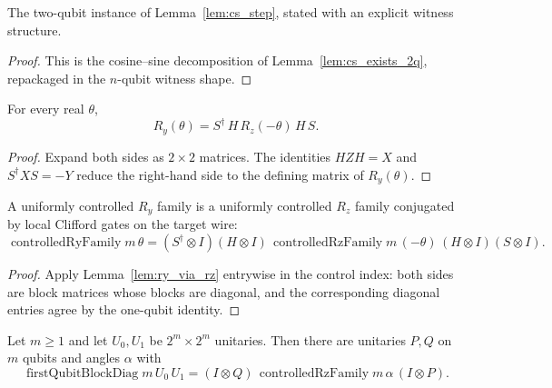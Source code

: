 \begin{lemma}
  \label{lem:cs_step_2q}
  \leanok
  The two-qubit instance of Lemma~\ref{lem:cs_step}, stated with an explicit
  witness structure.
\end{lemma}

\begin{proof}
  \leanok
  This is the cosine--sine decomposition of Lemma~\ref{lem:cs_exists_2q},
  repackaged in the $n$-qubit witness shape.
\end{proof}

\begin{lemma}[$R_y$ via $R_z$]
  \label{lem:ry_via_rz}
  \leanok
  For every real $\theta$,
  \[
    R_y(\theta) = S^\dagger\, H\, R_z(-\theta)\, H\, S.
  \]
\end{lemma}

\begin{proof}
  \leanok
  Expand both sides as $2 \times 2$ matrices.  The identities $HZH = X$ and
  $S^\dagger X S = -Y$ reduce the right-hand side to the defining matrix of
  $R_y(\theta)$.
\end{proof}

\begin{lemma}
  \label{lem:cry_via_crz}
  \leanok
  A uniformly controlled $R_y$ family is a uniformly controlled $R_z$ family
  conjugated by local Clifford gates on the target wire:
  \[
    \operatorname{controlledRyFamily} m\, \theta
      = (S^\dagger \otimes I)(H \otimes I)\,
        \operatorname{controlledRzFamily} m\, (-\theta)\,
        (H \otimes I)(S \otimes I).
  \]
\end{lemma}

\begin{proof}
  \leanok
  Apply Lemma~\ref{lem:ry_via_rz} entrywise in the control index: both sides
  are block matrices whose blocks are diagonal, and the corresponding diagonal
  entries agree by the one-qubit identity.
\end{proof}

\begin{lemma}
  \label{lem:demux}
  \leanok
  Let $m \ge 1$ and let $U_0, U_1$ be $2^m \times 2^m$ unitaries.  Then there
  are unitaries $P, Q$ on $m$ qubits and angles $\alpha$ with
  \[
    \operatorname{firstQubitBlockDiag} m\, U_0\, U_1
      = (I \otimes Q)\,
        \operatorname{controlledRzFamily} m\, \alpha\,
        (I \otimes P).
  \]
\end{lemma}


